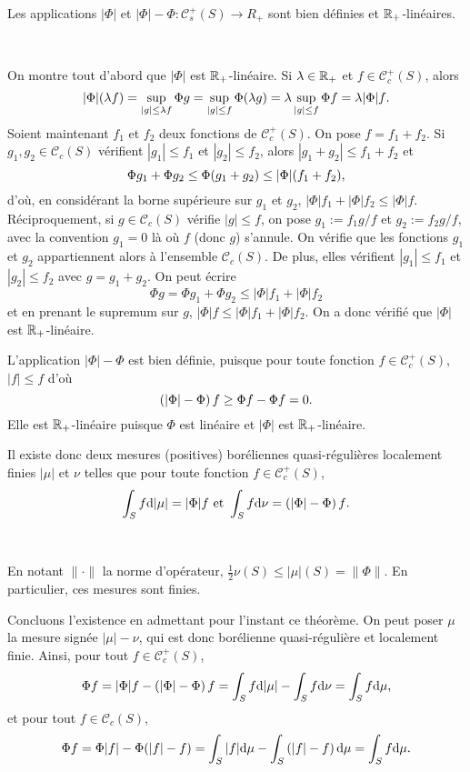\documentclass{article}
\begin{document}
\begin{Thm} Les applications $|\Phi|$ et $|\Phi|-\Phi:\mathcal C_s^+(S)\to R_+$ sont bien définies et $\mathbb{R}_+$-linéaires. \end{Thm}

\begin{Dem}~

On montre tout d'abord que $|\Phi|$ est $\mathbb{R}_+$-linéaire. Si $\lambda\in\mathbb{R}_+$ et $f\in\mathcal C_c^+(S)$, alors
$$|\Phi|(\lambda f) = \sup_{|g|\leq\lambda f}\Phi g
                    = \sup_{|g|\leq f}\Phi(\lambda g)
                    = \lambda\sup_{|g|\leq f}\Phi f
                    = \lambda|\Phi|f\text.$$
Soient maintenant $f_1$ et $f_2$ deux fonctions de $\mathcal C_c^+(S)$. On pose $f=f_1+f_2$. Si $g_1,g_2\in\mathcal C_c(S)$ vérifient $|g_1|\leq f_1$ et $|g_2|\leq f_2$, alors $|g_1+g_2|\leq f_1+f_2$ et
$$\Phi g_1+\Phi g_2\leq\Phi(g_1+g_2)\leq|\Phi|(f_1+f_2)\text,$$
d'où, en considérant la borne supérieure sur $g_1$ et $g_2$, $|\Phi|f_1+|\Phi|f_2\leq|\Phi|f$. Réciproquement, si $g\in\mathcal C_c(S)$ vérifie $|g|\leq f$, on pose
$g_1:=f_1g/f$ et $g_2:=f_2g/f$,
avec la convention $g_1=0$ là où $f$ (donc $g$) s'annule. On vérifie que les fonctions $g_1$ et $g_2$ appartiennent alors à l'ensemble $\mathcal C_c(S)$. De plus, elles vérifient $|g_1|\leq f_1$ et $|g_2|\leq f_2$ avec $g=g_1+g_2$. On peut écrire
$$\Phi g=\Phi g_1+\Phi g_2\leq|\Phi|f_1+|\Phi|f_2$$
et en prenant le supremum sur $g$, $|\Phi|f\leq|\Phi|f_1+|\Phi|f_2$. On a donc vérifié que $|\Phi|$ est $\mathbb{R}_+$-linéaire.

L'application $|\Phi|-\Phi$ est bien définie, puisque pour toute fonction $f\in\mathcal C_c^+(S)$, $|f|\leq f$ d'où $$\left(|\Phi|-\Phi\right)f\geq \Phi f-\Phi f=0\text.$$ Elle est $\mathbb{R}_+$-linéaire puisque $\Phi$ est linéaire et $|\Phi|$ est $\mathbb{R}_+$-linéaire.
\end{Dem}

Il existe donc deux mesures (positives) boréliennes quasi-régulières localement finies $|\mu|$ et $\nu$ telles que pour toute fonction $f\in\mathcal C_c^+(S)$,
$$\int_Sf\mathrm{d}|\mu|=|\Phi|f\text{ et }\int_Sf\mathrm{d}\nu=\left(|\Phi|-\Phi\right)f\text.$$

\begin{Thm}~

En notant $\|\cdot\|$ la norme d'opérateur, $\frac12\nu(S)\leq|\mu|(S)=\|\Phi\|$.
En particulier, ces mesures sont finies.
\end{Thm}

Concluons l'existence en admettant pour l'instant ce théorème. On peut poser $\mu$ la mesure signée $|\mu|-\nu$, qui est donc borélienne quasi-régulière et localement finie. Ainsi, pour tout $f\in\mathcal C_c^+(S)$,
$$\Phi f=|\Phi|f-\left(|\Phi|-\Phi\right)f=\int_Sf\mathrm{d}|\mu|-\int_Sf\mathrm{d}\nu=\int_Sf\mathrm{d}\mu\text,$$
et pour tout $f\in\mathcal C_c(S)$,
$$\Phi f=\Phi|f|-\Phi(|f|-f)=\int_S|f|\mathrm{d}\mu-\int_S\left(|f|-f\right)\mathrm{d}\mu=\int_Sf\mathrm{d}\mu\text.$$
\end{document}
